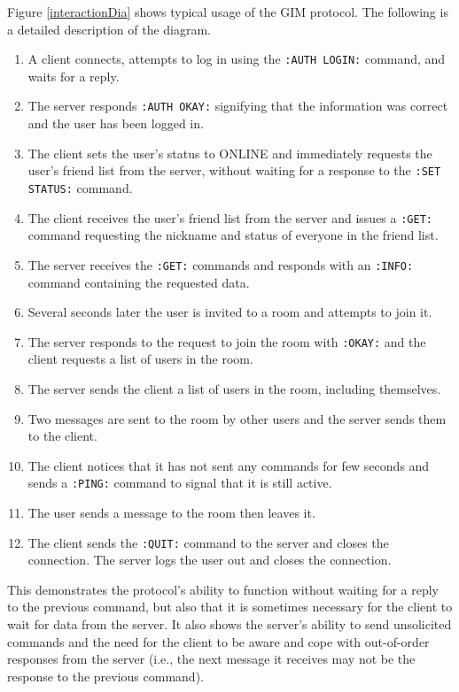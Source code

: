 Figure \ref{interactionDia} shows typical usage of the GIM protocol. The following is a detailed description of the diagram.

\begin{enumerate}
\item{A client connects, attempts to log in using the \texttt{:AUTH LOGIN:} command, and waits for a reply.}
\item{The server responds \texttt{:AUTH OKAY:} signifying that the information was correct and the user has been logged in.}
\item{The client sets the user's status to ONLINE and immediately requests the user's friend list from the server, without waiting for a response to the \texttt{:SET STATUS:} command.}
\item{The client receives the user's friend list from the server and issues a \texttt{:GET:} command requesting the nickname and status of everyone in the friend list.}
\item{The server receives the \texttt{:GET:} commands and responds with an \texttt{:INFO:} command containing the requested data.}
\item{Several seconds later the user is invited to a room and attempts to join it.}
\item{The server responds to the request to join the room with \texttt{:OKAY:} and the client requests a list of users in the room.}
\item{The server sends the client a list of users in the room, including themselves.}
\item{Two messages are sent to the room by other users and the server sends them to the client.}
\item{The client notices that it has not sent any commands for few seconds and sends a \texttt{:PING:} command to signal that it is still active.}
\item{The user sends a message to the room then leaves it.}
\item{The client sends the \texttt{:QUIT:} command to the server and closes the connection. The server logs the user out and closes the connection.}
\end{enumerate}

This demonstrates the protocol's ability to function without waiting for a reply to the previous command, but also that it is sometimes necessary for the client to wait for data from the server. It also shows the server's ability to send unsolicited commands and the need for the client to be aware and cope with out-of-order responses from the server (i.e., the next message it receives may not be the response to the previous command).

